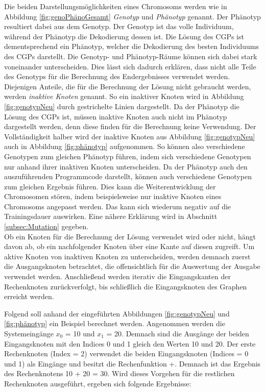 Die beiden Darstellungsmöglichkeiten eines Chromosoms werden wie in Abbildung \ref{fig:genoPhänoGesamt} \emph{Genotyp} und \emph{Phänotyp} genannt.
Der Phänotyp resultiert dabei aus dem Genotyp.
Der Genotyp ist das volle Individuum, während der Phänotyp die Dekodierung dessen ist.
Die Lösung des CGPs ist dementsprechend ein Phänotyp, welcher die Dekodierung des besten Individuums des CGPs darstellt.
Die Genotyp- und Phänotyp-Räume können sich dabei stark voneinander unterscheiden. \cite{eiben_introduction_2015}
Dies lässt sich dadurch erklären, dass nicht alle Teile des Genotyps für die Berechnung des Endergebnisses verwendet werden.
Diejenigen Anteile, die für die Berechnung der Lösung nicht gebraucht werden, werden \emph{inaktive Knoten} genannt.
So ein inaktiver Knoten wird in Abbildung \ref{fig:genotypNeu} durch gestrichelte Linien dargestellt.
Da der Phänotyp die Lösung des CGPs ist, müssen inaktive Knoten auch nicht im Phänotyp dargestellt werden, denn diese finden für die Berechnung keine Verwendung.
Der Vollständigkeit halber wird der inaktive Knoten aus Abbildung \ref{fig:genotypNeu} auch in Abbildung \ref{fig:phänotyp} aufgenommen.
So können also verschiedene Genotypen zum gleichen Phänotyp führen, indem sich verschiedene Genotypen nur anhand ihrer inaktiven Knoten unterscheiden.
Da der Phänotyp auch den auszuführenden Programmcode darstellt, können auch verschiedene Genotypen zum gleichen Ergebnis führen.
Dies kann die Weiterentwicklung der Chromosomen stören, indem beispielsweise nur inaktive Knoten eines Chromosoms angepasst werden.
Das kann sich wiederum negativ auf die Trainingsdauer auswirken.
Eine nähere Erklärung wird in Abschnitt \ref{subsec:Mutation} gegeben.\\
Ob ein Knoten für die Berechnung der Lösung verwendet wird oder nicht, hängt davon ab, ob ein nachfolgender Knoten über eine Kante auf diesen zugreift.
Um aktive Knoten von inaktiven Knoten zu unterscheiden, werden demnach zuerst die Ausgangsknoten betrachtet, die offensichtlich für die Auswertung der Ausgabe verwendet werden.
Anschließend werden iterativ die Eingangskanten der Rechenknoten zurückverfolgt, bis schließlich die Eingangsknoten des Graphen erreicht werden.

Folgend soll anhand der eingeführten Abbildungen \ref{fig:genotypNeu} und \ref{fig:phänotyp} ein Beispiel berechnet werden.
Angenommen werden die Systemeingänge $x_0$ = 10 und $x_1$ = 20.
Demnach sind die Ausgänge der beiden Eingangsknoten mit den Indices 0 und 1 gleich den Werten 10 und 20.
Der erste Rechenknoten (Index = 2) verwendet die beiden Eingangsknoten (Indices = 0 und 1) als Eingänge und besitzt die Rechenfunktion +.
Demnach ist das Ergebnis des Rechenknotens 10 + 20 = 30.
Wird dieses Vorgehen für die restlichen Rechenknoten ausgeführt, ergeben sich folgende Ergebnisse:

